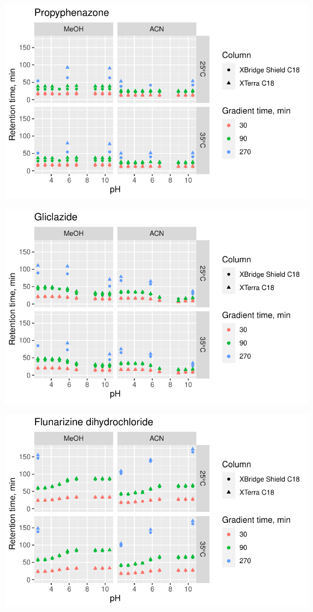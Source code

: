 \documentclass[
  letterpaper,
  DIV=11,
  numbers=noendperiod]{scrreprt}
\begin{document}
\includegraphics{index_files/figure-pdf/unnamed-chunk-4-108.pdf}

\includegraphics{index_files/figure-pdf/unnamed-chunk-4-109.pdf}

\includegraphics{index_files/figure-pdf/unnamed-chunk-4-110.pdf}
\end{document}
